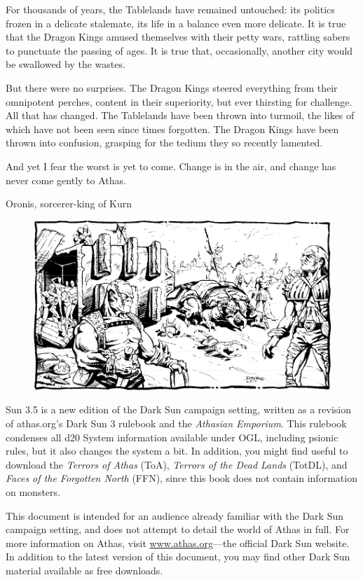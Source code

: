 {For thousands of years, the Tablelands have remained untouched: its politics frozen in a delicate stalemate, its life in a balance even more delicate. It is true that the Dragon Kings amused themselves with their petty wars, rattling sabers to punctuate the passing of ages. It is true that, occasionally, another city would be swallowed by the wastes.

But there were no surprises. The Dragon Kings steered everything from their omnipotent perches, content in their superiority, but ever thirsting for challenge. All that has changed. The Tablelands have been thrown into turmoil, the likes of which have not been seen since times forgotten. The Dragon Kings have been thrown into confusion, grasping for the tedium they so recently lamented.

And yet I fear the worst is yet to come. Change is in the air, and change has never come gently to Athas.}{Oronis, sorcerer-king of Kurn}

\begin{figure}[b!]
\centering
\includegraphics[width=\textwidth]{images/raiders-2.png}
\WOTC
\end{figure}

 Sun 3.5 is a new edition of the {\tableheader Dark Sun} campaign setting, written as a revision of athas.org's {\tableheader Dark Sun} 3 rulebook and the \emph{Athasian Emporium}. This rulebook condenses all d20 System information available under OGL, including psionic rules, but it also changes the system a bit. In addition, you might find useful to download the \emph{Terrors of Athas} (ToA), \emph{Terrors of the Dead Lands} (TotDL), and \emph{Faces of the Forgotten North} (FFN), since this book does not contain information on monsters.

This document is intended for an audience already familiar with the {\tableheader Dark Sun} campaign setting, and does not attempt to detail the world of Athas in full. For more information on Athas, visit \url{www.athas.org}---the official {\tableheader Dark Sun} website. In addition to the latest version of this document, you may find other {\tableheader Dark Sun} material available as free downloads.

